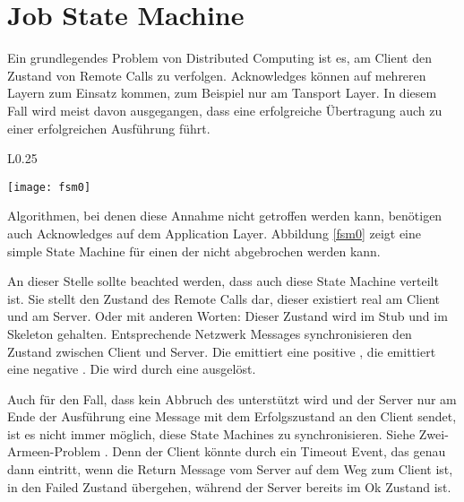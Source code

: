 \section{Job State Machine}
\label{jfsm}
Ein grundlegendes Problem von Distributed Computing ist es, am Client den Zustand von Remote Calls zu verfolgen.
Acknowledges können auf mehreren Layern zum Einsatz kommen, zum Beispiel nur am Tansport Layer.
In diesem Fall wird meist davon ausgegangen, dass eine erfolgreiche Übertragung auch zu einer erfolgreichen Ausführung führt.
\begin{wrapfigure}{L}{0.25\textwidth}
  \vspace{-20pt}
  \begin{center}
    \texttt{[image: fsm0]}
  \end{center}
  \caption{State Machine eines nicht abbrechbaren \rpc{}}
  \label{fsm0}
\end{wrapfigure}
Algorithmen, bei denen diese Annahme nicht getroffen werden kann, benötigen auch Acknowledges auf dem Application Layer.
Abbildung \ref{fsm0} zeigt eine simple State Machine für einen \rpc{} der nicht abgebrochen werden kann.

An dieser Stelle sollte beachted werden, dass auch diese State Machine verteilt ist.
Sie stellt den Zustand des Remote Calls dar, dieser existiert real am Client und am Server.
Oder mit anderen Worten: Dieser Zustand wird im Stub und im Skeleton gehalten.
Entsprechende Netzwerk Messages synchronisieren den Zustand zwischen Client und Server.
Die \TransReturnOk{} emittiert eine positive \ReturnMessage{}, die \TransReturnFail{} emittiert eine negative \ReturnMessage{}.
Die \TransCall{} wird durch eine \CallMessage{} ausgelöst.

Auch für den Fall, dass kein Abbruch des \rpc{} unterstützt wird und der Server nur am Ende der Ausführung eine Message mit dem Erfolgszustand an den Client sendet, ist es nicht immer möglich, diese State Machines zu synchronisieren. Siehe Zwei-Armeen-Problem \cite{tanenbaum4andrew}.
Denn der Client könnte durch ein Timeout Event, das genau dann eintritt, wenn die Return Message vom Server auf dem Weg zum Client ist, in den Failed Zustand übergehen, während der Server bereits im Ok Zustand ist.


